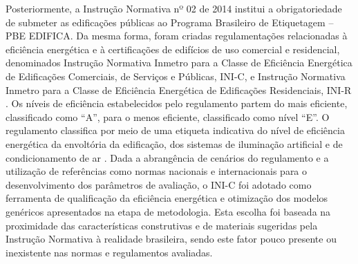 \begin{onehalfspace}
Posteriormente, a Instrução Normativa nº 02 de 2014 institui a obrigatoriedade de submeter as edificações públicas ao Programa Brasileiro de Etiquetagem – PBE EDIFICA. Da mesma forma, foram criadas regulamentações relacionadas à eficiência energética e à certificações de edifícios de uso comercial e residencial, denominados Instrução Normativa Inmetro para a Classe de Eficiência Energética de Edificações Comerciais, de Serviços e Públicas, INI-C, e Instrução Normativa Inmetro para a Classe de Eficiência Energética de Edificações Residenciais, INI-R \cite{Dalbem2017,InstitutoNacionaldeMetrologiaNormalizacaoeQualidadeIndustrial-INMETRO2018}.\vspace{0.3cm} \newline
Os níveis de eficiência estabelecidos pelo regulamento partem do mais eficiente, classificado como “A”, para o menos eficiente, classificado como nível “E”. O regulamento classifica por meio de uma etiqueta indicativa do nível de eficiência energética da envoltória da edificação, dos sistemas de iluminação artificial e de condicionamento de ar \cite{InstitutoNacionaldeMetrologiaNormalizacaoeQualidadeIndustrial-INMETRO2018a}.\vspace{0.3cm} \newline
Dada a abrangência de cenários do regulamento e a utilização de referências como normas nacionais e internacionais para o desenvolvimento dos parâmetros de avaliação, o INI-C foi adotado como ferramenta de qualificação da eficiência energética e otimização dos modelos genéricos apresentados na etapa de metodologia. Esta escolha foi baseada na proximidade das características construtivas e de materiais sugeridas pela Instrução Normativa à realidade brasileira, sendo este fator pouco presente ou inexistente nas normas e regulamentos avaliadas.

\end{onehalfspace}
